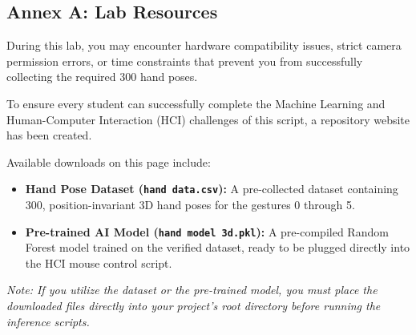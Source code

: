 \documentclass[11pt,a4paper]{article}
\begin{document}
\subsection*{Annex A: Lab Resources}
\label{sec:annex}
During this lab, you may encounter hardware compatibility issues, strict camera permission errors, or time constraints that prevent you from successfully collecting the required 300 hand poses. 

\begin{sloppypar}
To ensure every student can successfully complete the Machine Learning and Human-Computer Interaction (HCI) challenges of this script, a repository website has been created. 
\end{sloppypar}

\vspace{0.4cm}
\noindent{}
\vspace{0.4cm}

\noindent Available downloads on this page include:
\begin{itemize}
    \item \textbf{Hand Pose Dataset (\texttt{hand data.csv}):} A pre-collected dataset containing 300, position-invariant 3D hand poses for the gestures 0 through 5.
    \item \textbf{Pre-trained AI Model (\texttt{hand model 3d.pkl}):} A pre-compiled Random Forest model trained on the verified dataset, ready to be plugged directly into the HCI mouse control script.
\end{itemize}

\vspace{0.2cm}
\noindent \textit{Note: If you utilize the dataset or the pre-trained model, you must place the downloaded files directly into your project's root directory before running the inference scripts.}
\end{document}
